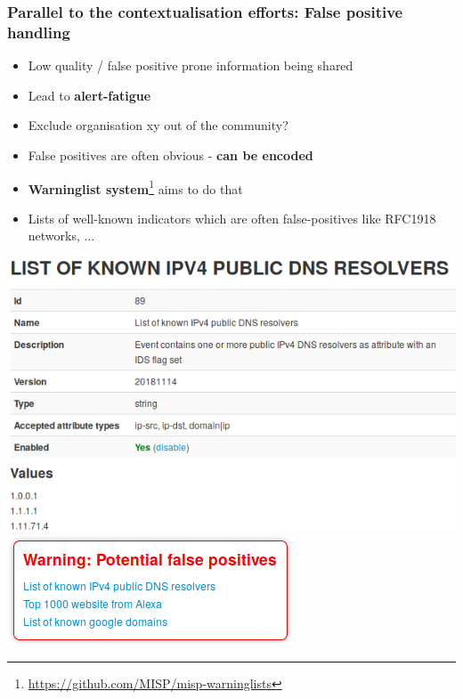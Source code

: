 \begin{frame}
\frametitle{Parallel to the contextualisation efforts: False positive handling}
\begin{itemize}
        \item Low quality / false positive prone information being shared
        \item Lead to {\bf alert-fatigue}
        \item Exclude organisation xy out of the community?
        \item False positives are often obvious - {\bf can be encoded}
        \item {\bf Warninglist system}\footnote{\url{https://github.com/MISP/misp-warninglists}} aims to do that
        \item Lists of well-known indicators which are often false-positives like RFC1918 networks, ...
\end{itemize}
\begin{center}
    \includegraphics[scale=0.22]{warning-list.png}
    \includegraphics[scale=0.45]{warning-list-event.png}
\end{center}
\end{frame}

